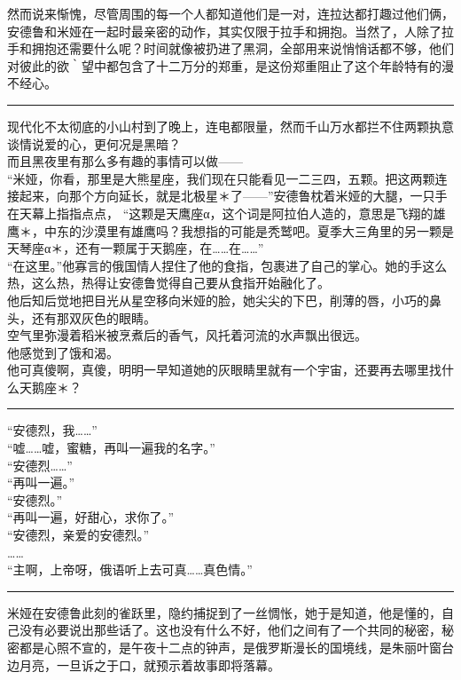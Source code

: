 \documentclass[oneside,11pt]{memoir} %
\begin{document}
\begin{CJK}{UTF8}{gbsn}
    然而说来惭愧，尽管周围的每一个人都知道他们是一对，连拉达都打趣过他们俩，安德鲁和米娅在一起时最亲密的动作，其实仅限于拉手和拥抱。当然了，人除了拉手和拥抱还需要什么呢？时间就像被扔进了黑洞，全部用来说悄悄话都不够，他们对彼此的欲｀望中都包含了十二万分的郑重，是这份郑重阻止了这个年龄特有的漫不经心。\\\indent
\rule{-3pt}{30pt}
    现代化不太彻底的小山村到了晚上，连电都限量，然而千山万水都拦不住两颗执意谈情说爱的心，更何况是黑暗？\\\indent
    而且黑夜里有那么多有趣的事情可以做——\\\indent
    “米娅，你看，那里是大熊星座，我们现在只能看见一二三四，五颗。把这两颗连接起来，向那个方向延长，就是北极星＊了——”安德鲁枕着米娅的大腿，一只手在天幕上指指点点， “这颗是天鹰座α，这个词是阿拉伯人造的，意思是飞翔的雄鹰＊，中东的沙漠里有雄鹰吗？我想指的可能是秃鹫吧。夏季大三角里的另一颗是天琴座α＊，还有一颗属于天鹅座，在……在……”\\\indent
    “在这里。”他寡言的俄国情人捏住了他的食指，包裹进了自己的掌心。她的手这么热，这么热，热得让安德鲁觉得自己要从食指开始融化了。\\\indent
    他后知后觉地把目光从星空移向米娅的脸，她尖尖的下巴，削薄的唇，小巧的鼻头，还有那双灰色的眼睛。\\\indent
    空气里弥漫着稻米被烹煮后的香气，风托着河流的水声飘出很远。\\\indent
    他感觉到了饿和渴。\\\indent
    他可真傻啊，真傻，明明一早知道她的灰眼睛里就有一个宇宙，还要再去哪里找什么天鹅座＊？\\\indent
  \rule{-3pt}{30pt}   
    “安德烈，我……”\\\indent
    “嘘……嘘，蜜糖，再叫一遍我的名字。”\\\indent
    “安德烈……”\\\indent
    “再叫一遍。”\\\indent
    “安德烈。”\\\indent
    “再叫一遍，好甜心，求你了。”\\\indent
    “安德烈，亲爱的安德烈。”\\\indent
    ……\\\indent
    “主啊，上帝呀，俄语听上去可真……真色情。”\\\indent
\rule{-3pt}{30pt}
    米娅在安德鲁此刻的雀跃里，隐约捕捉到了一丝惆怅，她于是知道，他是懂的，自己没有必要说出那些话了。这也没有什么不好，他们之间有了一个共同的秘密，秘密都是心照不宣的，是午夜十二点的钟声，是俄罗斯漫长的国境线，是朱丽叶窗台边月亮，一旦诉之于口，就预示着故事即将落幕。\\\indent

\end{CJK}
\end{document}
